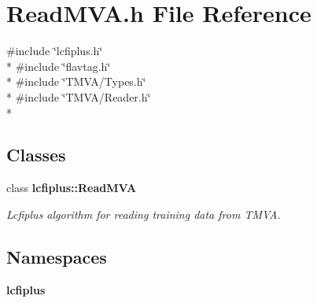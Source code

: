 \section{Read\-M\-V\-A.\-h File Reference}
\label{ReadMVA_8h}
{\ttfamily \#include \char`\"{}lcfiplus.\-h\char`\"{}}\\*
{\ttfamily \#include \char`\"{}flavtag.\-h\char`\"{}}\\*
{\ttfamily \#include \char`\"{}T\-M\-V\-A/\-Types.\-h\char`\"{}}\\*
{\ttfamily \#include \char`\"{}T\-M\-V\-A/\-Reader.\-h\char`\"{}}\\*
\subsection*{Classes}
\begin{DoxyCompactItemize}
\item 
class {\bf lcfiplus\-::\-Read\-M\-V\-A}
\begin{DoxyCompactList}\small\item\em Lcfiplus algorithm for reading training data from T\-M\-V\-A. \end{DoxyCompactList}\end{DoxyCompactItemize}
\subsection*{Namespaces}
\begin{DoxyCompactItemize}
\item 
{\bf lcfiplus}
\end{DoxyCompactItemize}
